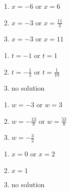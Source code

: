 \begin{multicols}{3}
\begin{enumerate}

\setcounter{enumi}{\value{HW}}

\item  $x = -6$ or $x=6$

\item $x = -3$ or $x= \frac{11}{3}$

\item $x = -3$ or $x= 11$

\setcounter{HW}{\value{enumi}}
\end{enumerate}
\end{multicols}

\begin{multicols}{3}
\begin{enumerate}
\setcounter{enumi}{\value{HW}}

\item  $t = -1$ or $t= 1$

\item $t=-\frac{1}{2}$ or $t= \frac{1}{10}$

\item no solution

\setcounter{HW}{\value{enumi}}
\end{enumerate}
\end{multicols}

\begin{multicols}{3}
\begin{enumerate}
\setcounter{enumi}{\value{HW}}

\item  $w=-3$ or $w= 3$

\item $w = -\frac{13}{8}$ or $w = \frac{53}{8}$

\item $w =-\frac{3}{2}$

\setcounter{HW}{\value{enumi}}
\end{enumerate}
\end{multicols}


\begin{multicols}{3}
\begin{enumerate}
\setcounter{enumi}{\value{HW}}

\item  $x=0$ or $x= 2$

\item  $x=1$

\item  no solution

\setcounter{HW}{\value{enumi}}
\end{enumerate}
\end{multicols}


